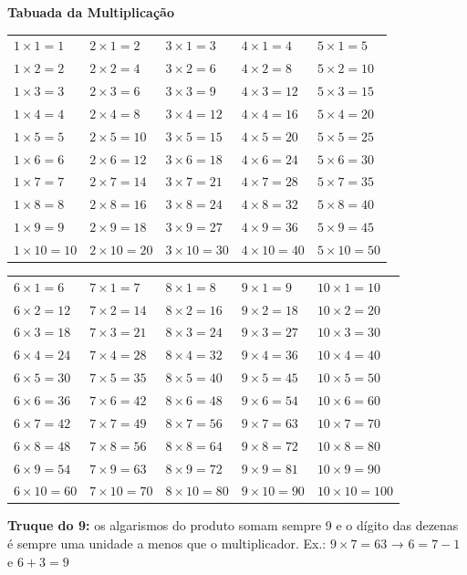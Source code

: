 \documentclass[12pt,twoside]{article}
\begin{document}
\begin{center}
     \textbf{\Large Tabuada da Multiplicação}
\end{center}

\setlength{\tabcolsep}{17pt}
\begin{tabular}{lllll}
$1\times1=1$  &$2\times1=2$  &$3\times1=3$  &$4\times1=4$  &$5\times1=5$  \\
$1\times2=2$  &$2\times2=4$  &$3\times2=6$  &$4\times2=8$  &$5\times2=10$ \\
$1\times3=3$  &$2\times3=6$  &$3\times3=9$  &$4\times3=12$ &$5\times3=15$ \\
$1\times4=4$  &$2\times4=8$  &$3\times4=12$ &$4\times4=16$ &$5\times4=20$ \\
$1\times5=5$  &$2\times5=10$ &$3\times5=15$ &$4\times5=20$ &$5\times5=25$ \\
$1\times6=6$  &$2\times6=12$ &$3\times6=18$ &$4\times6=24$ &$5\times6=30$ \\
$1\times7=7$  &$2\times7=14$ &$3\times7=21$ &$4\times7=28$ &$5\times7=35$ \\
$1\times8=8$  &$2\times8=16$ &$3\times8=24$ &$4\times8=32$ &$5\times8=40$ \\
$1\times9=9$  &$2\times9=18$ &$3\times9=27$ &$4\times9=36$ &$5\times9=45$ \\
$1\times10=10$&$2\times10=20$&$3\times10=30$&$4\times10=40$&$5\times10=50$\\
\end{tabular}

\vspace{0.5cm}

\begin{tabular}{lllll}
$6\times1=6$  &$7\times1=7$  &$8\times1=8$  &$9\times1=9$  &$10\times1=10$  \\
$6\times2=12$ &$7\times2=14$ &$8\times2=16$ &$9\times2=18$ &$10\times2=20$  \\
$6\times3=18$ &$7\times3=21$ &$8\times3=24$ &$9\times3=27$ &$10\times3=30$  \\
$6\times4=24$ &$7\times4=28$ &$8\times4=32$ &$9\times4=36$ &$10\times4=40$  \\
$6\times5=30$ &$7\times5=35$ &$8\times5=40$ &$9\times5=45$ &$10\times5=50$  \\
$6\times6=36$ &$7\times6=42$ &$8\times6=48$ &$9\times6=54$ &$10\times6=60$  \\
$6\times7=42$ &$7\times7=49$ &$8\times7=56$ &$9\times7=63$ &$10\times7=70$  \\
$6\times8=48$ &$7\times8=56$ &$8\times8=64$ &$9\times8=72$ &$10\times8=80$  \\
$6\times9=54$ &$7\times9=63$ &$8\times9=72$ &$9\times9=81$ &$10\times9=90$  \\
$6\times10=60$&$7\times10=70$&$8\times10=80$&$9\times10=90$&$10\times10=100$\\
\end{tabular}

\vspace{6pt}
\textbf{Truque do 9:} os algarismos do produto somam sempre 9 e o dígito das dezenas é sempre uma unidade a menos que o multiplicador. Ex.: $9 \times 7 = 63$ → $6 = 7-1$ e $6+3=9$ \checkmark


\end{document}
